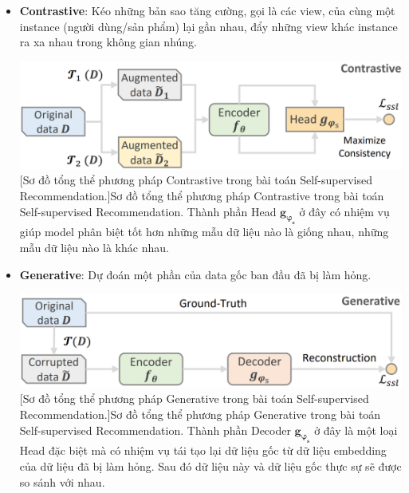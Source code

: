 \begin{itemize}
    \item[] \textbf{Contrastive}: Kéo những bản sao tăng cường, gọi là các view, của cùng một instance (người dùng/sản phẩm) lại gần nhau, đẩy những view khác instance ra xa nhau trong không gian nhúng.\\
    \begin{minipage}{\linewidth}
        \vspace*{+5mm}
        \centering
        \includegraphics[scale=0.3]{images/Chapter3/contras_ssr.png}
        [Sơ đồ tổng thể phương pháp Contrastive trong bài toán Self-supervised Recommendation.]{Sơ đồ tổng thể phương pháp Contrastive trong bài toán Self-supervised Recommendation. Thành phần Head $\bm{g_{\varphi_s}}$ ở đây có nhiệm vụ giúp model phân biệt tốt hơn những mẫu dữ liệu nào là giống nhau, những mẫu dữ liệu nào là khác nhau.}
    \end{minipage}
    
    \item[] \textbf{Generative}: Dự đoán một phần của data gốc ban đầu đã bị làm hỏng.\\
    \begin{minipage}{\linewidth}
        \vspace*{+5mm}
        \centering
        \includegraphics[scale=0.3]{images/Chapter3/gen_ssr.png}
        [Sơ đồ tổng thể phương pháp Generative trong bài toán Self-supervised Recommendation.]{Sơ đồ tổng thể phương pháp Generative trong bài toán Self-supervised Recommendation. Thành phần Decoder $\bm{g_{\varphi_s}}$ ở đây là một loại Head đặc biệt mà có nhiệm vụ tái tạo lại dữ liệu gốc từ dữ liệu embedding của dữ liệu đã bị làm hỏng. Sau đó dữ liệu này và dữ liệu gốc thực sự sẽ được so sánh với nhau.}
    \end{minipage}
    

\end{itemize}
